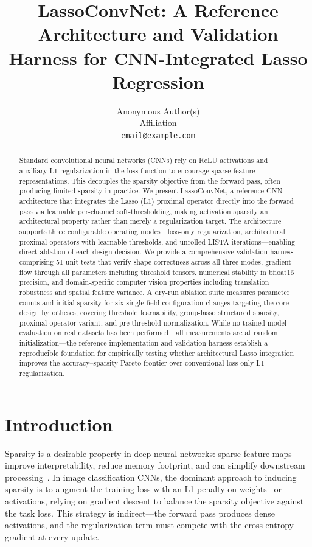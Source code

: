 \documentclass{article}
\title{LassoConvNet: A Reference Architecture and Validation Harness for
       CNN-Integrated Lasso Regression}
\author{Anonymous Author(s)\\
  Affiliation\\
  \texttt{email@example.com}
}
\begin{document}
\maketitle

\begin{abstract}
Standard convolutional neural networks (CNNs) rely on ReLU activations and
auxiliary L1 regularization in the loss function to encourage sparse feature
representations. This decouples the sparsity objective from the forward pass,
often producing limited sparsity in practice. We present LassoConvNet, a
reference CNN architecture that integrates the Lasso (L1) proximal operator
directly into the forward pass via learnable per-channel soft-thresholding,
making activation sparsity an architectural property rather than merely a
regularization target. The architecture supports three configurable operating
modes---loss-only regularization, architectural proximal operators with
learnable thresholds, and unrolled LISTA iterations---enabling direct ablation
of each design decision. We provide a comprehensive validation harness
comprising 51 unit tests that verify shape correctness across all three modes,
gradient flow through all parameters including threshold tensors, numerical
stability in bfloat16 precision, and domain-specific computer vision properties
including translation robustness and spatial feature variance. A dry-run
ablation suite measures parameter counts and initial sparsity for six
single-field configuration changes targeting the core design hypotheses,
covering threshold learnability, group-lasso structured sparsity, proximal
operator variant, and pre-threshold normalization. While no trained-model
evaluation on real datasets has been performed---all measurements are at
random initialization---the reference implementation and validation harness
establish a reproducible foundation for empirically testing whether
architectural Lasso integration improves the accuracy--sparsity Pareto
frontier over conventional loss-only L1 regularization.
\end{abstract}

\section{Introduction}

Sparsity is a desirable property in deep neural networks: sparse feature maps
improve interpretability, reduce memory footprint, and can simplify downstream
processing~\cite{louizos2018learning, gale2019state}. In image classification
CNNs, the dominant approach to inducing sparsity is to augment the training loss
with an L1 penalty on weights~\cite{han2015learning} or activations, relying on
gradient descent to balance the sparsity objective against the task loss. This
strategy is indirect---the forward pass produces dense activations, and the
regularization term must compete with the cross-entropy gradient at every update.
\end{document}
